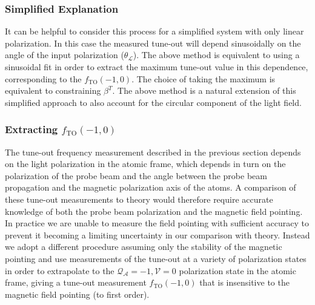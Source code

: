 
	\subsubsection{Simplified Explanation}

	It can be helpful to consider this process for a simplified system with only linear polarization. In this case the measured tune-out will depend sinusoidally on the angle of the input polarization (\(\theta_{\mathcal{L}}\)). The above method is equivalent to using a sinusoidal fit in order to extract the maximum tune-out value in this dependence, corresponding to the \(f_{\mathrm{TO}}(-1,0)\). The choice of taking the maximum is equivalent to constraining \( \beta^T \). The above method is a natural extension of this simplified approach to also account for the circular component of the light field.

\subsubsection{Extracting \(f_{\mathrm{TO}}(-1,0)\)}

	The tune-out frequency measurement described in the previous section depends on the light polarization in the atomic frame, which depends in turn on the polarization of the probe beam and the angle between the probe beam propagation and the magnetic polarization axis of the atoms. A comparison of these tune-out measurements to theory would therefore require accurate knowledge of both the probe beam polarization and the magnetic field pointing. In practice we are unable to measure the field pointing with sufficient accuracy to prevent it becoming a limiting uncertainty in our comparison with theory.
	Instead we adopt a different procedure assuming only the stability of the magnetic pointing and use measurements of the tune-out at a variety of polarization states in order to extrapolate to the \(\mathcal{Q_{A}}=-1,\mathcal{V}=0\) polarization state in the atomic frame, giving a tune-out measurement \(f_{\mathrm{TO}}(-1,0)\) that is insensitive to the magnetic field pointing (to first order). 

